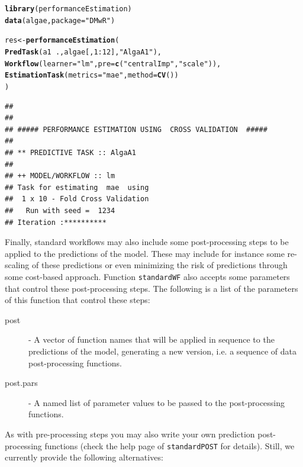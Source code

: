 \documentclass[10pt,a4paper]{article}\usepackage[]{graphicx}\usepackage[]{color}
\makeatletter
\newcommand{\hlnum}[1]{\textcolor[rgb]{0.686,0.059,0.569}{#1}}%
\newcommand{\hlstr}[1]{\textcolor[rgb]{0.192,0.494,0.8}{#1}}%
\newcommand{\hlopt}[1]{\textcolor[rgb]{0,0,0}{#1}}%
\newcommand{\hlstd}[1]{\textcolor[rgb]{0.345,0.345,0.345}{#1}}%
\newcommand{\hlkwb}[1]{\textcolor[rgb]{0.69,0.353,0.396}{#1}}%
\newcommand{\hlkwc}[1]{\textcolor[rgb]{0.333,0.667,0.333}{#1}}%
\newcommand{\hlkwd}[1]{\textcolor[rgb]{0.737,0.353,0.396}{\textbf{#1}}}%
\newenvironment{kframe}{%
 \def\at@end@of@kframe{}%
 \ifinner\ifhmode%
  \def\at@end@of@kframe{\end{minipage}}%
  \begin{minipage}{\columnwidth}%
 \fi\fi%
 \def\FrameCommand##1{\hskip\@totalleftmargin \hskip-\fboxsep
 \colorbox{shadecolor}{##1}\hskip-\fboxsep
     \hskip-\linewidth \hskip-\@totalleftmargin \hskip\columnwidth}%
 \MakeFramed {\advance\hsize-\width
   \@totalleftmargin\z@ \linewidth\hsize
   \@setminipage}}%
 {\par\unskip\endMakeFramed%
 \at@end@of@kframe}
\newenvironment{knitrout}{}{} %
\makeatother
\begin{document}
\begin{knitrout}\footnotesize
{}\color{fgcolor}\begin{kframe}
\begin{alltt}
\hlkwd{library}\hlstd{(performanceEstimation)}
\hlkwd{data}\hlstd{(algae,}\hlkwc{package}\hlstd{=}\hlstr{"DMwR"}\hlstd{)}

\hlstd{res} \hlkwb{<-} \hlkwd{performanceEstimation}\hlstd{(}
         \hlkwd{PredTask}\hlstd{(a1} \hlopt{~} \hlstd{.,algae[,}\hlnum{1}\hlopt{:}\hlnum{12}\hlstd{],}\hlstr{"AlgaA1"}\hlstd{),}
         \hlkwd{Workflow}\hlstd{(}\hlkwc{learner}\hlstd{=}\hlstr{"lm"}\hlstd{,}\hlkwc{pre}\hlstd{=}\hlkwd{c}\hlstd{(}\hlstr{"centralImp"}\hlstd{,}\hlstr{"scale"}\hlstd{)),}
         \hlkwd{EstimationTask}\hlstd{(}\hlkwc{metrics}\hlstd{=}\hlstr{"mae"}\hlstd{,}\hlkwc{method}\hlstd{=}\hlkwd{CV}\hlstd{())}
         \hlstd{)}
\end{alltt}
\begin{verbatim}
## 
## 
## ##### PERFORMANCE ESTIMATION USING  CROSS VALIDATION  #####
## 
## ** PREDICTIVE TASK :: AlgaA1
## 
## ++ MODEL/WORKFLOW :: lm 
## Task for estimating  mae  using
##  1 x 10 - Fold Cross Validation
## 	 Run with seed =  1234 
## Iteration :**********
\end{verbatim}
\end{kframe}
\end{knitrout}

Finally, standard workflows may also include some post-processing steps to be applied to the predictions of the model. These may include for instance some re-scaling of these predictions or even minimizing the risk of predictions through some cost-based approach. Function \texttt{standardWF} also accepts some parameters that control these post-processing steps. The following is a list of the parameters of this function that control these steps:

\begin{description}
\item[post] - A vector of function names that will be applied in sequence to the
  predictions of the model, generating a new version, i.e. a sequence of data
  post-processing functions.

\item[post.pars] - A named list of parameter values to be passed to the post-processing functions.
\end{description}

As with pre-processing steps you may also write your own prediction post-processing functions (check the help page of \texttt{standardPOST} for details). Still, we currently provide the following alternatives:
\end{document}
